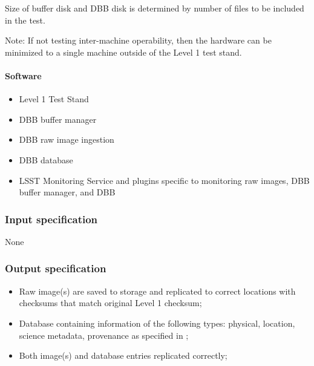\documentclass[DM,lsstdraft,STS,toc]{lsstdoc}
\begin{document}
Size of buffer disk and DBB disk is determined by number of files to be included in the test.


Note: If not testing inter-machine operability, then the hardware can be minimized
to a single machine outside of the Level 1 test stand.


\paragraph{Software}
\begin{itemize}
\item{Level 1 Test Stand}
\item{DBB buffer manager}
\item{DBB raw image ingestion}
\item{DBB database}
\item{LSST Monitoring Service and plugins specific to monitoring raw images, DBB buffer manager, and DBB}
\end{itemize}




\subsubsection{Input specification}
None


\subsubsection{Output specification}
\begin{itemize}
\item{Raw image(s) are saved to storage and replicated to correct locations with checksums that match
original Level 1 checksum;}
\item{Database containing information of the following types: physical, location, science metadata,
provenance as specified in ;}
\item{Both image(s) and database entries replicated correctly;}
\end{itemize}
\end{document}
